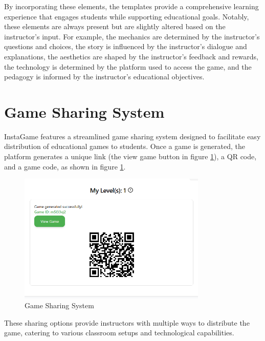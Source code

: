 By incorporating these elements, the templates provide a comprehensive learning experience that engages students while supporting educational goals. Notably, these elements are always present but are slightly altered based on the instructor's input. For example, the mechanics are determined by the instructor's questions and choices, the story is influenced by the instructor's dialogue and explanations, the aesthetics are shaped by the instructor's feedback and rewards, the technology is determined by the platform used to access the game, and the pedagogy is informed by the instructor's educational objectives.


\section{Game Sharing System}

InstaGame features a streamlined game sharing system designed to facilitate easy distribution of educational games to students. Once a game is generated, the platform generates a unique link (the view game button in figure \ref{fig:shareGame}), a QR code, and a game code, as shown in figure \ref{fig:shareGame}. 
\begin{figure}
	\centering
	\includegraphics[width=0.8\textwidth]{figures/Space_Invaders/Instructor_Portal_Space_Invader_Generated_Links.png}
	\caption{Game Sharing System}
	\label{fig:shareGame}
\end{figure}
These sharing options provide instructors with multiple ways to distribute the game, catering to various classroom setups and technological capabilities.

